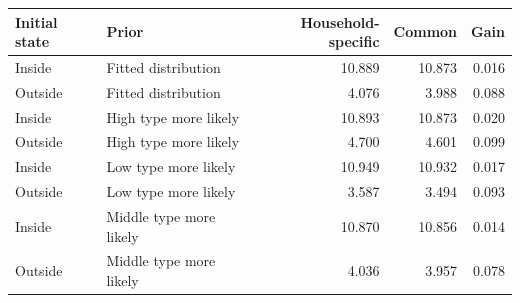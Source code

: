 \begin{tabular}{llrrr}\toprule
Initial state & Prior & Household-specific & Common & Gain\\\midrule
Inside & Fitted distribution & 10.889 & 10.873 & 0.016 \\
Outside & Fitted distribution & 4.076 & 3.988 & 0.088 \\
Inside & High type more likely & 10.893 & 10.873 & 0.020 \\
Outside & High type more likely & 4.700 & 4.601 & 0.099 \\
Inside & Low type more likely & 10.949 & 10.932 & 0.017 \\
Outside & Low type more likely & 3.587 & 3.494 & 0.093 \\
Inside & Middle type more likely & 10.870 & 10.856 & 0.014 \\
Outside & Middle type more likely & 4.036 & 3.957 & 0.078 \\
\bottomrule\end{tabular}
